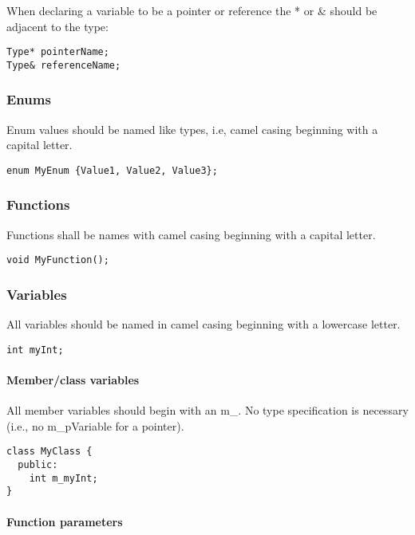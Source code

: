 \documentclass[12pt]{article}
\begin{document}
When declaring a variable to be a pointer or reference the * or \& should be
adjacent to the type:

\begin{lstlisting}
Type* pointerName;
Type& referenceName;
\end{lstlisting}

\subsubsection{Enums}
Enum values should be named like types, i.e, camel casing beginning with a
capital letter.

\begin{lstlisting}[mathescape]
enum MyEnum {Value1, Value2, Value3};
\end{lstlisting}

\subsubsection{Functions}
Functions shall be names with camel casing beginning with a capital letter.

\begin{lstlisting}
void MyFunction();
\end{lstlisting}

\subsubsection{Variables}

All variables should be named in camel casing beginning with a lowercase letter.

\begin{lstlisting}
int myInt;
\end{lstlisting}

\paragraph{Member/class variables}

All member variables should begin with an m\_. No type specification is
necessary (i.e., no m\_pVariable for a pointer).


\begin{lstlisting}[mathescape]
class MyClass {
  public:
    int m_myInt;
}
\end{lstlisting}

\paragraph{Function parameters}
\end{document}
